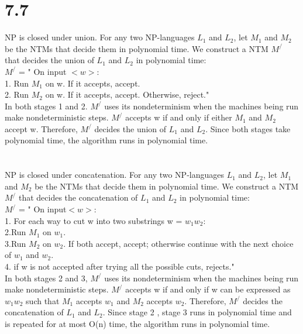 \documentclass{scrartcl}
\begin{document}
\section*{7.7}
NP is closed under union. For any two NP-languages $L_1$ and $L_2$, let $M_1$ and $M_2$ be the NTMs that decide them in polynomial time. We construct a NTM $M^/$ that decides the union of $L_1$ and $L_2$ in polynomial time:\\
$M^/$ = " On input $<w>$:\\
1. Run $M_1$ on w. If it accepts, accept.\\
2. Run $M_2$ on w. If it accepts, accept. Otherwise, reject."\\
In both stages 1 and 2. $M^/$ uses its nondeterminism when the machines being run make nondeterministic steps. $M^/$ accepts w if and only if either $M_1$ and $M_2$ accept w.
Therefore, $M^/$ decides the union of $L_1$ and $L_2$. Since both stages take polynomial time, the algorithm runs in polynomial time.
\\
\\
\\
NP is closed under concatenation. For any two NP-languages $L_1$ and $L_2$, let $M_1$ and $M_2$ be the NTMs that decide them in polynomial time. We construct a NTM $M^/$ that decides the concatenation of $L_1$ and $L_2$ in polynomial time:\\
$M^/$ = " On input$<w>$:\\
1. For each way to cut w into two substrings w = $w_1w_2$:\\
2.\qquad Run $M_1$ on $w_1$.\\
3.\qquad Run $M_2$ on $w_2$. If both accept, accept; otherwise continue with the next choice of $w_1$ and $w_2$.\\
4. if w is not accepted after trying all the possible cuts, rejects." \\
In both stages 2 and 3, $M^/$ uses its nondeterminism when the machines being run make nondeterministic steps. $M^/$ accepts w if and only if w can be expressed as $w_1w_2$ such that $M_1$ accepts $w_1$ and $M_2$ accepts $w_2$. Therefore, $M^/$ decides the concatenation of $L_1$ and $L_2$. Since stage 2 , stage 3 runs in polynomial time and is repeated for at most O(n) time, the algorithm runs in polynomial time.
\end{document}

